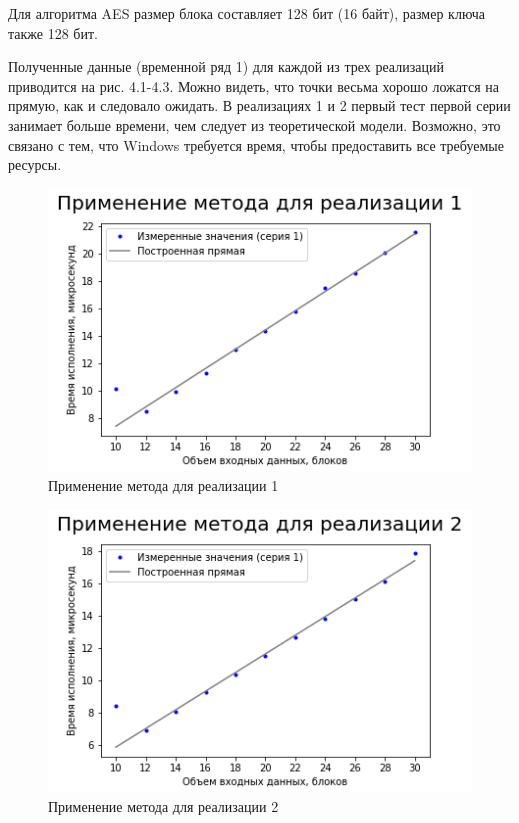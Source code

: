 Для алгоритма AES размер блока составляет 128 бит (16 байт), размер ключа также 128 бит.

Полученные данные (временной ряд 1) для каждой из трех реализаций приводится на рис. 4.1-4.3. Можно видеть, что точки весьма хорошо ложатся на прямую, как и следовало ожидать. В реализациях 1 и 2 первый тест первой серии занимает больше времени, чем следует из теоретической модели. Возможно, это связано с тем, что Windows требуется время, чтобы предоставить все требуемые ресурсы.

\begin{figure}[ht!] 
	\includegraphics [scale=0.8] {my_folder/plots//plot1}
	\centering
	\caption{Применение метода для реализации 1} 
\end{figure}

\begin{figure}[ht!] 
	\includegraphics [scale=0.7] {my_folder/plots//plot2}
	\centering
	\caption{Применение метода для реализации 2} 
\end{figure}

